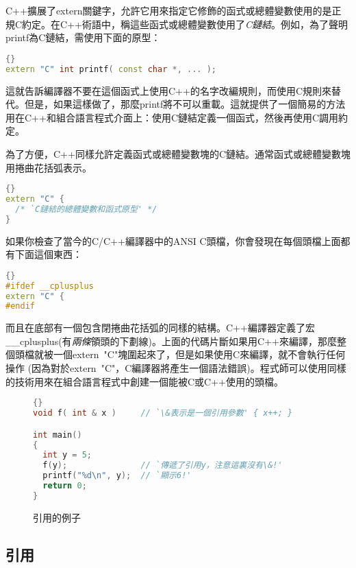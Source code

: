 C++擴展了{\code extern}關鍵字，允許它用來指定它修飾的函式或總體變數使用的是正規C約定。在C++術語中，稱這些函式或總體變數使用了\emph{C鏈結}。例如，為了聲明{\code printf}為C鏈結，需使用下面的原型：
\begin{lstlisting}[language=C++,stepnumber=0]{}
extern "C" int printf( const char *, ... );
\end{lstlisting}
\noindent 這就告訴編譯器不要在這個函式上使用C++的名字改編規則，而使用C規則來替代。但是，如果這樣做了，那麼{\code printf}將不可以重載。這就提供了一個簡易的方法用在C++和組合語言程式介面上：使用C鏈結定義一個函式，然後再使用C調用約定。

為了方便，C++同樣允許定義函式或總體變數塊的C鏈結。通常函式或總體變數塊用捲曲花括弧表示。
\lstset{escapeinside=`',language=Pascal,%
}
\begin{lstlisting}[stepnumber=0,language=C++]{}
extern "C" {
  /* `C鏈結的總體變數和函式原型' */
}
\end{lstlisting}

如果你檢查了當今的C/C++編譯器中的ANSI C頭檔，你會發現在每個頭檔上面都有下面這個東西：
\begin{lstlisting}[stepnumber=0,language=C++]{}
#ifdef __cplusplus
extern "C" {
#endif
\end{lstlisting}
\noindent 而且在底部有一個包含閉捲曲花括弧的同樣的結構。C++編譯器定義了宏{\code \_\_cplusplus}(有\emph{兩條}領頭的下劃線)。上面的代碼片斷如果用C++來編譯，那麼整個頭檔就被一個{\code extern~"C"}塊圍起來了，但是如果使用C來編譯，就不會執行任何操作
(因為對於{\code extern~"C"}，C編譯器將產生一個語法錯誤)。程式師可以使用同樣的技術用來在組合語言程式中創建一個能被C或C++使用的頭檔。

\begin{figure}
\lstset{escapeinside=`',language=Pascal,%
}
\begin{lstlisting}[language=C++,frame=tlrb]{}
void f( int & x )     // `\&表示是一個引用參數' { x++; }

int main()
{
  int y = 5;
  f(y);               // `傳遞了引用y，注意這裏沒有\&!'
  printf("%d\n", y);  // `顯示6!'
  return 0;
}
\end{lstlisting}
\caption{引用的例子\label{fig:refex}}
\end{figure}

\subsection{引用}

